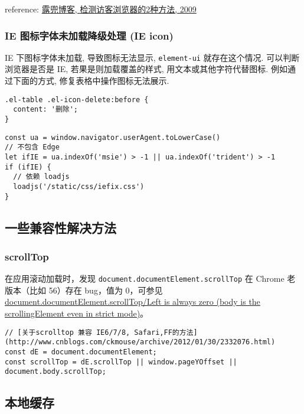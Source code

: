 reference:
\href{http://www.ludou.org/2-way-to-detect-browser.html}{露兜博客,
检测访客浏览器的2种方法, 2009}

\subsubsection{IE 图标字体未加载降级处理 (IE
icon)}\label{ie-ux56feux6807ux5b57ux4f53ux672aux52a0ux8f7dux964dux7ea7ux5904ux7406-ie-icon}

IE 下图标字体未加载, 导致图标无法显示, \lstinline!element-ui!
就存在这个情况. 可以判断浏览器是否是 IE, 若果是则加载覆盖的样式,
用文本或其他字符代替图标. 例如通过下面的方式,
修复表格中操作图标无法展示.

\begin{lstlisting}
.el-table .el-icon-delete:before {
  content: '删除';
}
\end{lstlisting}

\begin{lstlisting}
const ua = window.navigator.userAgent.toLowerCase()
// 不包含 Edge
let ifIE = ua.indexOf('msie') > -1 || ua.indexOf('trident') > -1
if (ifIE) {
  // 依赖 loadjs
  loadjs('/static/css/iefix.css')
}
\end{lstlisting}

\subsection{一些兼容性解决方法}\label{ux4e00ux4e9bux517cux5bb9ux6027ux89e3ux51b3ux65b9ux6cd5}

\subsubsection{scrollTop}\label{scrolltop}

在应用滚动加载时，发现 \lstinline!document.documentElement.scrollTop! 在
Chrome 老版本（比如 56）存在 bug，值为 0，可参见
\href{https://bugs.chromium.org/p/chromium/issues/detail?id=157855}{document.documentElement.scrollTop/Left
is always zero (body is the scrollingElement even in strict mode)}。

\begin{lstlisting}
// [关于scrolltop 兼容 IE6/7/8, Safari,FF的方法](http://www.cnblogs.com/ckmouse/archive/2012/01/30/2332076.html)
const dE = document.documentElement;
const scrollTop = dE.scrollTop || window.pageYOffset || document.body.scrollTop;
\end{lstlisting}

\subsection{本地缓存}\label{ux672cux5730ux7f13ux5b58}

